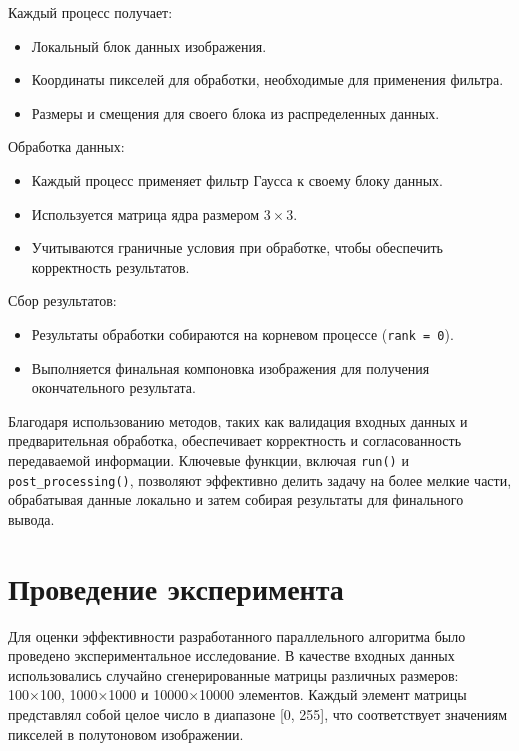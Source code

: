 \documentclass[14pt]{extarticle}
\theoremstyle{definition}
\theoremstyle{remark}
\begin{document}
Каждый процесс получает:
\begin{itemize}
    \item Локальный блок данных изображения.
    \item Координаты пикселей для обработки, необходимые для применения фильтра.
    \item Размеры и смещения для своего блока из распределенных данных.\\
\end{itemize}

Обработка данных:
\begin{itemize}
    \item Каждый процесс применяет фильтр Гаусса к своему блоку данных.
    \item Используется матрица ядра размером $3 \times 3$.
    \item Учитываются граничные условия при обработке, чтобы обеспечить корректность результатов.\\
\end{itemize}

Сбор результатов:
\begin{itemize}
    \item Результаты обработки собираются на корневом процессе (\texttt{rank = 0}).
    \item Выполняется финальная компоновка изображения для получения окончательного результата.\\
\end{itemize}

Благодаря использованию методов, таких как валидация входных данных и предварительная обработка, обеспечивает корректность и согласованность передаваемой информации. Ключевые функции, включая \texttt{run()} и \texttt{post\_processing()}, позволяют эффективно делить задачу на более мелкие части, обрабатывая данные локально и затем собирая результаты для финального вывода.

\clearpage
\section{Проведение эксперимента}

Для оценки эффективности разработанного параллельного алгоритма было проведено экспериментальное исследование. В качестве входных данных использовались случайно сгенерированные матрицы различных размеров: 100×100, 1000×1000 и 10000×10000 элементов. Каждый элемент матрицы представлял собой целое число в диапазоне [0, 255], что соответствует значениям пикселей в полутоновом изображении.
\end{document}
